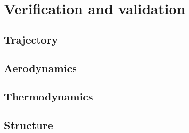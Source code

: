 \section{Verification and validation}

\subsection{Trajectory} \label{sec:VandVtraj}


\subsection{Aerodynamics} \label{sec:VandVaero}


\subsection{Thermodynamics} \label{sec:VandVthermo}


\subsection{Structure} \label{sec:VandVstruc}

